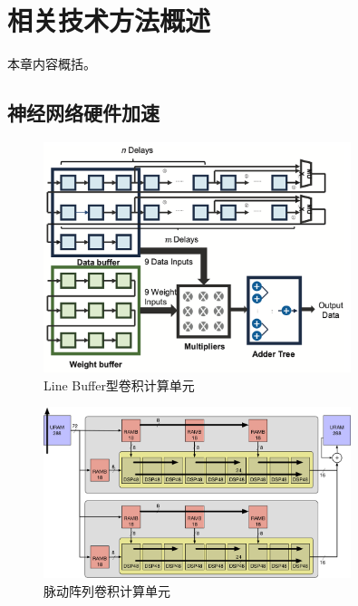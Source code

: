 \chapter{相关技术方法概述}
本章内容概括。



\section{神经网络硬件加速}

\begin{figure}[h]
	\centering
	\includegraphics[width=0.8\textwidth]{figure/line-buffer}
	\caption{Line Buffer型卷积计算单元} 
	\label{fig:conv}
\end{figure}


\begin{figure}[h]
	\centering
	\includegraphics[width=0.8\textwidth]{figure/array}
	\caption{脉动阵列卷积计算单元} 
	\label{fig:conv}
\end{figure}


